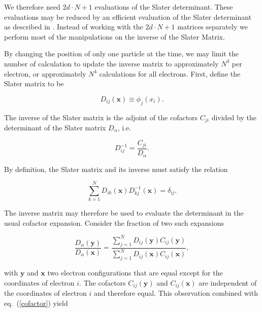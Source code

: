 We therefore need $2d\cdot N + 1$ evaluations of the Slater
determinant. These evaluations may be reduced by an
efficient evaluation of the Slater determinant as described in
\cite{hammond1994}. Instead of working with the $2d\cdot N + 1$
matrices separately we perform most of the manipulations on
the inverse of the Slater Matrix.

By changing the position of only one particle at the time, we may
limit the number of calculation to update the inverse matrix to
approximately $N^3$ per electron, or approximately $N^4$ calculations
for all electrons.
\newline
%
\newline
First, define the Slater matrix to be

\begin{equation*}
  D_{ij}(\mathbf{x})\equiv\phi_j(x_i).
\end{equation*}

The inverse of the Slater matrix is the adjoint of the cofactors
$C_{ji}$ divided by the determinant of the Slater matrix $D_{\alpha}$,
i.e.

\begin{equation}
  D_{ij}^{-1}=\frac{C_{ji}}{D_{\alpha}}. 
\label{cofactor} 
\end{equation}

By definition, the Slater matrix and its inverse must satisfy the
relation

\begin{equation}
  \sum_{k=1}^N D_{ik}(\mathbf{x})D_{kj}^{-1}(\mathbf{x})=\delta_{ij}.
\label{SlaterInverse}
\end{equation}

The inverse matrix may therefore be used to evaluate the determinant
in the usual cofactor expansion. Consider the fraction of two such
expansions

\begin{equation}
  \frac{D_{\alpha}(\mathbf{y})}{D_{\alpha}(\mathbf{x})}=
  \frac{\sum\limits_{j=1}^N D_{ij}(\mathbf{y})C_{ij}(\mathbf{y})}
  {\sum\limits_{j=1}^N D_{ij}(\mathbf{x})C_{ij}(\mathbf{x})},
\label{cofactorExpansion}
\end{equation}

with $\mathbf{y}$ and $\mathbf{x}$ two electron configurations that
are equal except for the coordinates of electron $i$. The cofactors
$C_{ij}(\mathbf{y})$ and $C_{ij}(\mathbf{x})$ are independent of
the coordinates of electron $i$ and therefore equal. This observation
combined with eq.~(\ref{cofactor}) yield

